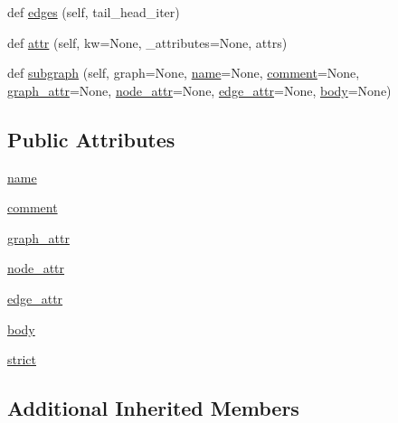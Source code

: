 \begin{DoxyCompactItemize}
\item 
def \hyperlink{classgraphviz_1_1dot_1_1Dot_a644b305ee0699911022f442fd452b847}{edges} (self, tail\+\_\+head\+\_\+iter)
\item 
def \hyperlink{classgraphviz_1_1dot_1_1Dot_a095c4f4959996ac084b5a0f736f66aa8}{attr} (self, kw=None, \+\_\+attributes=None, attrs)
\item 
def \hyperlink{classgraphviz_1_1dot_1_1Dot_afd0431341f53b05bab054c6bf1ade7ea}{subgraph} (self, graph=None, \hyperlink{classgraphviz_1_1dot_1_1Dot_a8770063bf65f4c1c5abb66e306e8a2c8}{name}=None, \hyperlink{classgraphviz_1_1dot_1_1Dot_af86327a4da464a67b07151e065c252b1}{comment}=None, \hyperlink{classgraphviz_1_1dot_1_1Dot_a158faacad5caf468932bbb891f6465ce}{graph\+\_\+attr}=None, \hyperlink{classgraphviz_1_1dot_1_1Dot_aaac93f4deda12a49316c442df4633d50}{node\+\_\+attr}=None, \hyperlink{classgraphviz_1_1dot_1_1Dot_a7658b0204c84c1401744c56abe9d6fd9}{edge\+\_\+attr}=None, \hyperlink{classgraphviz_1_1dot_1_1Dot_a445a58c4a1ec19e89778e3a9bf026415}{body}=None)
\end{DoxyCompactItemize}
\subsection*{Public Attributes}
\begin{DoxyCompactItemize}
\item 
\hyperlink{classgraphviz_1_1dot_1_1Dot_a8770063bf65f4c1c5abb66e306e8a2c8}{name}
\item 
\hyperlink{classgraphviz_1_1dot_1_1Dot_af86327a4da464a67b07151e065c252b1}{comment}
\item 
\hyperlink{classgraphviz_1_1dot_1_1Dot_a158faacad5caf468932bbb891f6465ce}{graph\+\_\+attr}
\item 
\hyperlink{classgraphviz_1_1dot_1_1Dot_aaac93f4deda12a49316c442df4633d50}{node\+\_\+attr}
\item 
\hyperlink{classgraphviz_1_1dot_1_1Dot_a7658b0204c84c1401744c56abe9d6fd9}{edge\+\_\+attr}
\item 
\hyperlink{classgraphviz_1_1dot_1_1Dot_a445a58c4a1ec19e89778e3a9bf026415}{body}
\item 
\hyperlink{classgraphviz_1_1dot_1_1Dot_aa54e02b54826b368aaffd59855fecddf}{strict}
\end{DoxyCompactItemize}
\subsection*{Additional Inherited Members}


